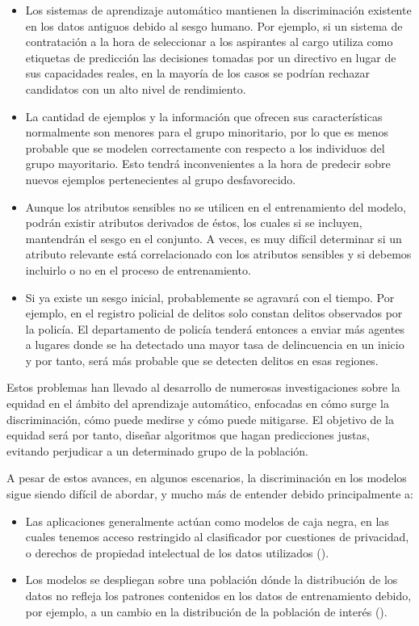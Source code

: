 \documentclass[oneside,openright,titlepage,numbers=noenddot,openany,headinclude,footinclude=true,
cleardoublepage=empty,abstractoff,BCOR=5mm,paper=a4,fontsize=12pt,main=spanish]{scrreprt}
\begin{document}
\begin{itemize}
    \item Los sistemas de aprendizaje automático mantienen la discriminación existente en los datos antiguos debido al sesgo humano. Por ejemplo, si un sistema de contratación a la hora de seleccionar a los aspirantes al cargo utiliza como etiquetas de predicción las decisiones tomadas por un directivo en lugar de sus capacidades reales, en la mayoría de los casos se podrían rechazar candidatos con un alto nivel de rendimiento.
    \item La cantidad de ejemplos y la información que ofrecen sus características normalmente son menores para el grupo minoritario, por lo que es menos probable que se modelen correctamente con respecto a los individuos del grupo mayoritario. Esto tendrá inconvenientes a la hora de predecir sobre nuevos ejemplos pertenecientes al grupo desfavorecido.
    \item Aunque los atributos sensibles no se utilicen en el entrenamiento del modelo, podrán existir atributos derivados de éstos, los cuales si se incluyen, mantendrán el sesgo en el conjunto. A veces, es muy difícil determinar si un atributo relevante está correlacionado con los atributos sensibles y si debemos incluirlo o no en el proceso de entrenamiento.
    \item Si ya existe un sesgo inicial, probablemente se agravará con el tiempo. Por ejemplo, en el registro policial de delitos solo constan delitos observados por la policía. El departamento de policía tenderá entonces a enviar más agentes a lugares donde se ha detectado una mayor tasa de delincuencia en un inicio y por tanto, será más probable que se detecten delitos en esas regiones. 
\end{itemize}

Estos problemas han llevado al desarrollo de numerosas investigaciones sobre la equidad en el ámbito del aprendizaje automático, enfocadas en cómo surge la discriminación, cómo puede medirse y cómo puede mitigarse. El objetivo de la equidad será por tanto, diseñar algoritmos que hagan predicciones justas, evitando perjudicar a un determinado grupo de la población.

A pesar de estos avances, en algunos escenarios, la discriminación en los modelos sigue siendo difícil de abordar, y mucho más de entender debido principalmente a: 

\begin{itemize}
    \item Las aplicaciones generalmente actúan como modelos de caja negra, en las cuales tenemos acceso restringido al clasificador por cuestiones de privacidad, o derechos de propiedad intelectual de los datos utilizados (\cite{blackbox2014}).
	\item Los modelos se despliegan sobre una población dónde la distribución de los datos no refleja los patrones contenidos en los datos de entrenamiento debido, por ejemplo, a un cambio en la distribución de la población de interés (\cite{distributionmodel2017}).
\end{itemize}
\end{document}
